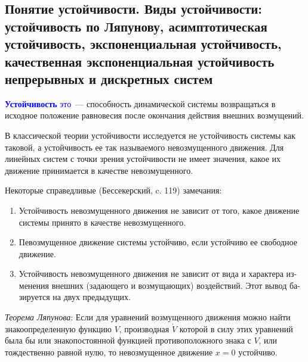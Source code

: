 \subsection{Понятие 	устойчивости. Виды устойчивости: 	устойчивость по Ляпунову, асимптотическая 	устойчивость, экспоненциальная устойчивость, качественная экспоненциальная 	устойчивость непрерывных и дискретных 	систем}


\textcolor{blue}{\textbf{Устойчивость} это}~--- способность динамической системы возвращаться в исходное положение равновесия после окончания действия внешних возмущений.

В классической теории устойчивости исследуется не устойчивость системы как таковой, а устойчивость ее так называемого невозмущенного движения. Для линейных систем с точки зрения устойчивости не имеет значения, какое их движение принимается в качестве невозмущенного.

Некоторые справедливые (Бессекерский, c. 119) замечания:
\begin{enumerate}
    \item Устойчивость невозмущенного движения не зависит от того, какое движение
системы принято в качестве невозмущенного.
    \item Певозмущенное движение системы устойчиво, если устойчиво ее свободное
движение.
    \item Устойчивость невозмущенного движения не зависит от вида и характера из-
менения внешних (задающего и возмущающих) воздействий. Этот вывод ба-
зируется на двух предыдущих.
\end{enumerate}

\textit{Теорема Ляпунова}:
Если для уравнений возмущенного движения можно найти знакоопределенную функцию $V$, производная $\dot V$ которой в силу этих уравнений была бы или знакопостоянной функцией противоположного знака с $V$, или тождественно равной нулю, то невозмущенное движение $x=0$ устойчиво.


